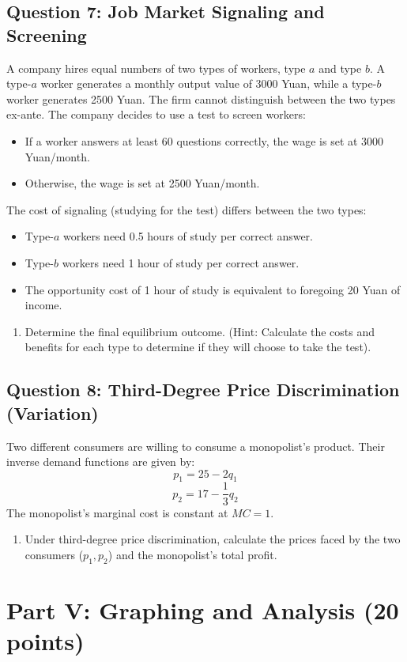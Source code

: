 \documentclass[12pt, a4paper]{article}
\begin{document}
\subsection*{Question 7: Job Market Signaling and Screening}
A company hires equal numbers of two types of workers, type $a$ and type $b$. A type-$a$ worker generates a monthly output value of 3000 Yuan, while a type-$b$ worker generates 2500 Yuan. The firm cannot distinguish between the two types ex-ante. The company decides to use a test to screen workers:
\begin{itemize}
    \item If a worker answers at least 60 questions correctly, the wage is set at 3000 Yuan/month.
    \item Otherwise, the wage is set at 2500 Yuan/month.
\end{itemize}
The cost of signaling (studying for the test) differs between the two types:
\begin{itemize}
    \item Type-$a$ workers need 0.5 hours of study per correct answer.
    \item Type-$b$ workers need 1 hour of study per correct answer.
    \item The opportunity cost of 1 hour of study is equivalent to foregoing 20 Yuan of income.
\end{itemize}
\begin{enumerate}
    \item[(a)] Determine the final equilibrium outcome. (Hint: Calculate the costs and benefits for each type to determine if they will choose to take the test).
\end{enumerate}

\subsection*{Question 8: Third-Degree Price Discrimination (Variation)}
Two different consumers are willing to consume a monopolist's product. Their inverse demand functions are given by:
\[ p_1 = 25 - 2q_1 \]
\[ p_2 = 17 - \frac{1}{3}q_2 \]
The monopolist's marginal cost is constant at $MC = 1$.
\begin{enumerate}
    \item[(a)] Under third-degree price discrimination, calculate the prices faced by the two consumers ($p_1, p_2$) and the monopolist's total profit.
\end{enumerate}

\section*{Part V: Graphing and Analysis (20 points)}
\end{document}
